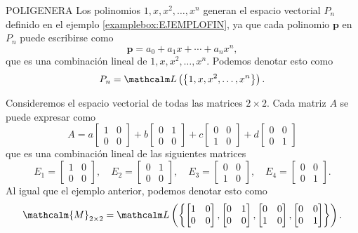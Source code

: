 \begin{examplebox}{}{POLIGENERA}
    Los polinomios $1, x, x^2, \dots, x^n$ generan el espacio vectorial $P_n$ definido en el ejemplo \ref{examplebox:EJEMPLOFIN}, ya que cada polinomio $\mathbf{p}$ en $P_n$ puede escribirse como
    $$\mathbf{p} = a_0 + a_1x + \cdots + a_nx^n,$$
    que es una combinación lineal de $1, x, x^2, \dots, x^n$. Podemos denotar esto como
    $$P_n = \Gen\left(\left\{1, x, x^2, \dots, x^n\right\}\right).$$
\end{examplebox}

\begin{examplebox}{}{}
    Consideremos el espacio vectorial de todas las matrices $2 \times 2$. Cada matriz $A$ se puede expresar como
    $$A = a \begin{bmatrix}
        1 & 0 \\
        0 & 0
    \end{bmatrix} + b \begin{bmatrix}
        0 & 1 \\
        0 & 0
    \end{bmatrix} + c \begin{bmatrix}
        0 & 0 \\
        1 & 0
    \end{bmatrix} + d \begin{bmatrix}
        0 & 0 \\
        0 & 1
    \end{bmatrix}$$
    que es una combinación lineal de las siguientes matrices
    $$E_1 = \begin{bmatrix}
        1 & 0 \\
        0 & 0
    \end{bmatrix}, \quad E_2 = \begin{bmatrix}
        0 & 1 \\
        0 & 0
    \end{bmatrix}, \quad E_3 = \begin{bmatrix}
        0 & 0 \\
        1 & 0
    \end{bmatrix}, \quad E_4 = \begin{bmatrix}
        0 & 0 \\
        0 & 1
    \end{bmatrix}.$$
    Al igual que el ejemplo anterior, podemos denotar esto como
    $$\mathcalm{M}_{2 \times 2} = \Gen\left(\left\{ \begin{bmatrix}
        1 & 0 \\
        0 & 0
    \end{bmatrix}, \begin{bmatrix}
        0 & 1 \\
        0 & 0
    \end{bmatrix}, \begin{bmatrix}
        0 & 0 \\
        1 & 0
    \end{bmatrix}, \begin{bmatrix}
        0 & 0 \\
        0 & 1
    \end{bmatrix} \right\}\right).$$
\end{examplebox}


